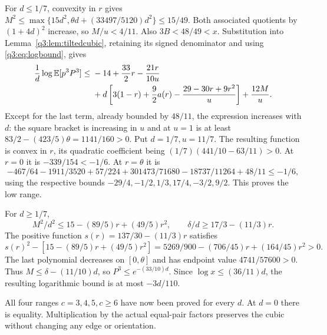 For $d\le1/7$, convexity in $r$ gives
$M^2\le\max\{15d^2,\theta d+(33497/5120)d^2\}\le15/49$.
Both associated quotients by $(1+4d)^2$ increase, so $M/u<4/11$. Also $3B<48/49<x$. Substitution into Lemma~\ref{q3:lem:tiltedcubic}, retaining its signed denominator and using \eqref{q3:eq:logbound}, gives
\[
\begin{split}
 \frac1d\log\mathbb E[p^3P^3]\le{}&
 -14+\frac{33}2r-\frac{21r}{10u}\\
 &+d\left[3(1-r)+\frac92a(r)-\frac{29-30r+9r^2}{u}\right]
 +\frac{12M}{u}.
\end{split}
\]
Except for the last term, already bounded by $48/11$, the expression increases with $d$: the square bracket is increasing in $u$ and at $u=1$ is at least
$83/2-(423/5)\theta=1141/160>0$.
Put $d=1/7,u=11/7$. The resulting function is convex in $r$, its quadratic coefficient being $(1/7)(441/10-63/11)>0$.
At $r=0$ it is $-339/154<-1/6$.
At $r=\theta$ it is
\[
 -467/64-1911/3520+57/224+301473/71680-18737/11264+48/11
 \le-1/6,
\]
using the respective bounds $-29/4,-1/2,1/3,17/4,-3/2,9/2$.
This proves the low range.

For $d\ge1/7$,
\[
 M^2/d^2\le15-(89/5)r+(49/5)r^2,\qquad
 \delta/d\ge17/3-(11/3)r .
\]
The positive function $s(r)=137/30-(11/3)r$ satisfies
\[
 s(r)^2-[15-(89/5)r+(49/5)r^2]
 =5269/900-(706/45)r+(164/45)r^2>0.
\]
The last polynomial decreases on $[0,\theta]$ and has endpoint value $4741/57600>0$. Thus $M\le\delta-(11/10)d$, so $P^3\le e^{-(33/10)d}$.
Since $\log x\le(36/11)d$, the resulting logarithmic bound is at most $-3d/110$.

All four ranges $c=3,4,5,c\ge6$ have now been proved for every $d$. At $d=0$ there is equality. Multiplication by the actual equal-pair factors preserves the cubic without changing any edge or orientation.
